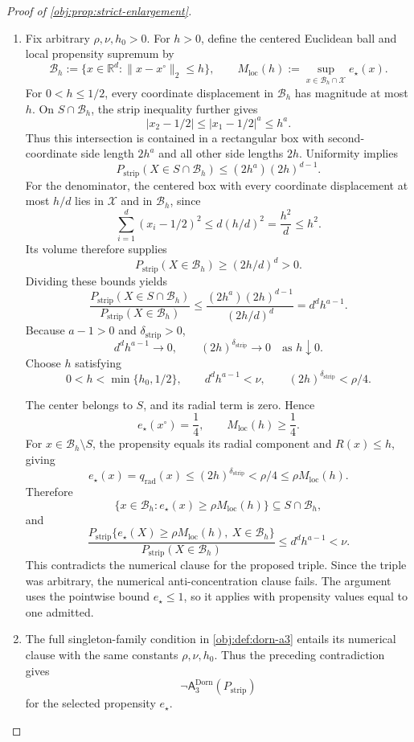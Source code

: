 \documentclass[11pt]{article}
\begin{document}
\begin{proof}[Proof of \cref{obj:prop:strict-enlargement}]
\begin{enumerate}
\item Fix arbitrary \(\rho,\nu,h_0>0\). For \(h>0\), define the centered Euclidean ball and local propensity supremum by
\[
\mathcal B_h:=\{x\in\mathbb R^d:\|x-x^\circ\|_2\le h\},
\qquad
M_{\mathrm{loc}}(h)
:=\sup_{x\in\mathcal B_h\cap\mathcal X}e_\star(x).
\]
For \(0<h\le1/2\), every coordinate displacement in \(\mathcal B_h\) has magnitude at most \(h\). On \(S\cap\mathcal B_h\), the strip inequality further gives
\[
|x_2-1/2|\le |x_1-1/2|^a\le h^a.
\]
Thus this intersection is contained in a rectangular box with second-coordinate side length \(2h^a\) and all other side lengths \(2h\). Uniformity implies
\[
P_{\mathrm{strip}}(X\in S\cap\mathcal B_h)
\le(2h^a)(2h)^{d-1}.
\]
For the denominator, the centered box with every coordinate displacement at most \(h/d\) lies in \(\mathcal X\) and in \(\mathcal B_h\), since
\[
\sum_{i=1}^d(x_i-1/2)^2
\le d(h/d)^2
=\frac{h^2}{d}\le h^2.
\]
Its volume therefore supplies
\[
P_{\mathrm{strip}}(X\in\mathcal B_h)
\ge(2h/d)^d>0.
\]
Dividing these bounds yields
\[
\frac{P_{\mathrm{strip}}(X\in S\cap\mathcal B_h)}
{P_{\mathrm{strip}}(X\in\mathcal B_h)}
\le
\frac{(2h^a)(2h)^{d-1}}{(2h/d)^d}
=d^d h^{a-1}.
\]
Because \(a-1>0\) and \(\delta_{\mathrm{strip}}>0\),
\[
d^d h^{a-1}\longrightarrow0,
\qquad
(2h)^{\delta_{\mathrm{strip}}}\longrightarrow0
\quad\text{as }h\downarrow0.
\]
Choose \(h\) satisfying
\[
0<h<\min\{h_0,1/2\},
\qquad
d^d h^{a-1}<\nu,
\qquad
(2h)^{\delta_{\mathrm{strip}}}<\rho/4.
\]

The center belongs to \(S\), and its radial term is zero. Hence
\[
e_\star(x^\circ)=\frac14,
\qquad
M_{\mathrm{loc}}(h)\ge\frac14.
\]
For \(x\in\mathcal B_h\setminus S\), the propensity equals its radial component and \(R(x)\le h\), giving
\[
e_\star(x)=q_{\mathrm{rad}}(x)
\le(2h)^{\delta_{\mathrm{strip}}}
<\rho/4
\le\rho M_{\mathrm{loc}}(h).
\]
Therefore
\[
\{x\in\mathcal B_h:e_\star(x)\ge\rho M_{\mathrm{loc}}(h)\}
\subseteq S\cap\mathcal B_h,
\]
and
\[
\frac{
P_{\mathrm{strip}}\{e_\star(X)\ge\rho M_{\mathrm{loc}}(h),
\ X\in\mathcal B_h\}
}{
P_{\mathrm{strip}}(X\in\mathcal B_h)
}
\le d^d h^{a-1}<\nu.
\]
This contradicts the numerical clause for the proposed triple. Since the triple was arbitrary, the numerical anti-concentration clause fails. The argument uses the pointwise bound \(e_\star\le1\), so it applies with propensity values equal to one admitted.

\item The full singleton-family condition in \cref{obj:def:dorn-a3} entails its numerical clause with the same constants \(\rho,\nu,h_0\). Thus the preceding contradiction gives
\[
\neg\mathsf A_3^{\mathrm{Dorn}}(P_{\mathrm{strip}})
\]
for the selected propensity \(e_\star\).


\end{enumerate}
\end{proof}
\end{document}
